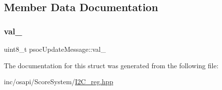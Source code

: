 \subsection{Member Data Documentation}
\mbox{\label{structpsoc_update_message_a79436a9bab15bac4c80de00eedd35c50}} 
\subsubsection{\texorpdfstring{val\+\_\+}{val\_}}
{\footnotesize\ttfamily uint8\+\_\+t psoc\+Update\+Message\+::val\+\_\+}



The documentation for this struct was generated from the following file\+:\begin{DoxyCompactItemize}
\item 
inc/osapi/\+Score\+System/\hyperlink{_i2_c__reg_8hpp}{I2\+C\+\_\+reg.\+hpp}\end{DoxyCompactItemize}
